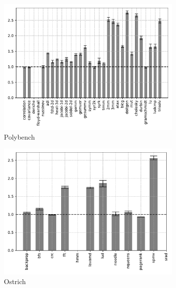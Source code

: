 \begin{figure}
    \centering
    \begin{subfigure}[t]{\textwidth}
        \includegraphics[width=\textwidth]
        {Images/6.1.RQ1/polybench-wasmer-llvm-simd.pdf}
        \caption{Polybench}
    \end{subfigure}
    \begin{subfigure}[t]{.45\textwidth}
        \includegraphics[width=\textwidth]
        {Images/6.1.RQ1/ostrich-wasmer-llvm-simd.pdf}
        \caption{Ostrich}
    \end{subfigure}
    \begin{subfigure}[t]{.45\textwidth}

\end{subfigure}
\end{figure}

